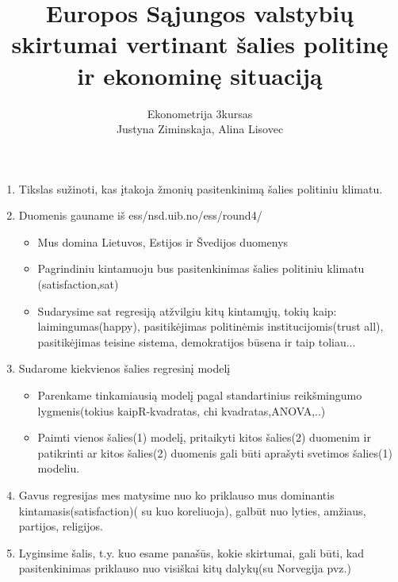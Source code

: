 \documentclass[12pt, a4paper, lithuanian]{article}
\title{Europos Sąjungos valstybių skirtumai vertinant šalies politinę ir ekonominę situaciją  }
\author{Ekonometrija 3kursas\\  Justyna Ziminskaja, Alina Lisovec}
\begin{document}











\flushleft
\begin{enumerate}
\item  Tikslas sužinoti, kas įtakoja žmonių pasitenkinimą šalies politiniu klimatu.
\item Duomenis gauname iš ess/nsd.uib.no/ess/round4/

\begin{itemize}
\item  Mus domina Lietuvos, Estijos ir Švedijos duomenys
\item Pagrindiniu kintamuoju bus pasitenkinimas šalies politiniu klimatu (satisfaction,sat)
\item Sudarysime sat  regresiją atžvilgiu kitų kintamųjų, tokių kaip: laimingumas(happy), pasitikėjimas politinėmis institucijomis(trust all), pasitikėjimas teisine sistema, demokratijos būsena ir taip toliau... 
\end{itemize}
\item Sudarome kiekvienos šalies regresinį modelį
 \begin{itemize}
 \item Parenkame tinkamiausią modelį pagal standartinius reikšmingumo lygmenis(tokius kaipR-kvadratas, chi kvadratas,ANOVA,..)   
\item Paimti vienos šalies(1) modelį, pritaikyti kitos šalies(2) duomenim ir patikrinti ar kitos šalies(2) duomenis gali būti aprašyti svetimos šalies(1) modeliu. 
 \end{itemize} 

\item Gavus regresijas mes matysime nuo ko priklauso mus dominantis kintamasis(satisfaction)( su kuo koreliuoja), galbūt nuo lyties, amžiaus, partijos, religijos.
\item Lyginsime šalis, t.y.  kuo esame panašūs, kokie skirtumai, gali būti, kad pasitenkinimas priklauso nuo visiškai kitų dalykų(su Norvegija pvz.)
\end{enumerate}


\end{document}
